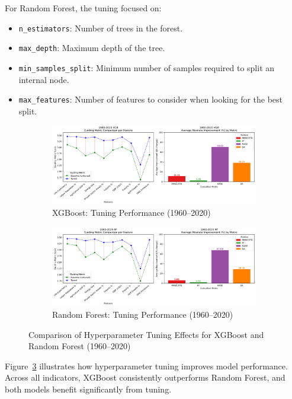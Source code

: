 \documentclass[12pt]{article}
\begin{document}
For Random Forest, the tuning focused on:
\begin{itemize}
    \item \texttt{n\_estimators}: Number of trees in the forest.
    \item \texttt{max\_depth}: Maximum depth of the tree.
    \item \texttt{min\_samples\_split}: Minimum number of samples required to split an internal node.
    \item \texttt{max\_features}: Number of features to consider when looking for the best split.
\end{itemize}
\begin{figure}[h]
    \centering
    \begin{subfigure}[t]{0.9\textwidth}
        \centering
        \includegraphics[width=\linewidth]{1960_2020_XGB_metrics.png}
        \caption{XGBoost: Tuning Performance (1960--2020)}
        \label{fig:xgb_tuning_1960_2020}
    \end{subfigure}
    \vspace{1em}
    \begin{subfigure}[t]{0.9\textwidth}
        \centering
        \includegraphics[width=\linewidth]{1960_2020_RF_metrics.png}
        \caption{Random Forest: Tuning Performance (1960--2020)}
        \label{fig:rf_tuning_1960_2020}
    \end{subfigure}
    \caption{Comparison of Hyperparameter Tuning Effects for XGBoost and Random Forest (1960--2020)}
    \label{fig:tuning_combined}
\end{figure}
Figure~\ref{fig:tuning_combined} illustrates how hyperparameter tuning improves model performance. Across all indicators, XGBoost consistently outperforms Random Forest, and both models benefit significantly from tuning.
\end{document}
